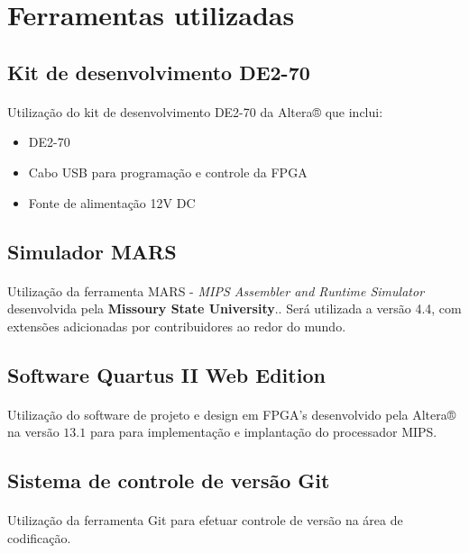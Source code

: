 \documentclass[notitlepage]{report}
\begin{document}
{\section{Ferramentas utilizadas}

\subsection{Kit de desenvolvimento DE2-70}
\paragraph{}{Utilização do kit de desenvolvimento DE2-70 da Altera® que inclui:
\begin{itemize}
\item DE2-70
\item Cabo USB para programação e controle da FPGA
\item Fonte de alimentação 12V DC
\end{itemize} }

\subsection{Simulador MARS}
\paragraph{}{Utilização da ferramenta MARS - \textit{MIPS Assembler and Runtime Simulator} desenvolvida pela \textbf{Missoury State University}.\cite{MARS13}. Será utilizada a versão 4.4, com extensões adicionadas por contribuidores ao redor do mundo.}

\subsection{Software Quartus II Web Edition}
\paragraph{}{Utilização do software de projeto e design em FPGA's desenvolvido pela Altera® na versão $ 13.1 $ para  para implementação e implantação do processador MIPS. \cite {QUARTUS14}}

\subsection{Sistema de controle de versão Git}
\paragraph{}{Utilização da ferramenta Git para efetuar controle de versão na área de codificação. \cite {GIT14}}

}
\end{document}
